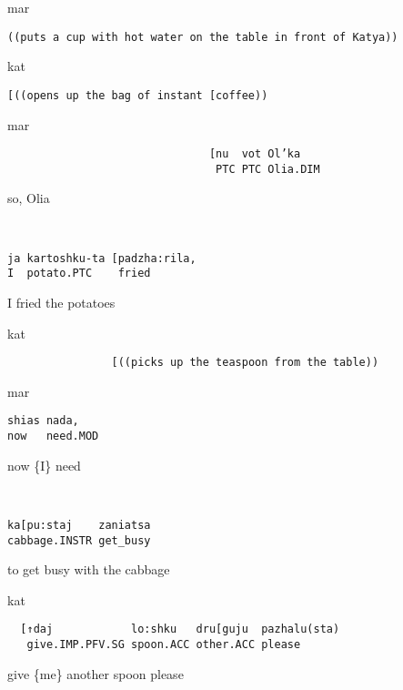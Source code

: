 \documentclass[output=paper,modfonts,nonflat]{langsci/langscibook}
\begin{document}
\vspace{2mm}
%
\begin{transbox}{1}{mar}
\begin{verbatim}
((puts a cup with hot water on the table in front of Katya))
\end{verbatim}
\end{transbox}
%
\begin{transbox}{2}{kat}%
\begin{verbatim}
[((opens up the bag of instant [coffee))
\end{verbatim}
\end{transbox}
%
\begin{transbox}{3}{mar}%
\begin{verbatim}
                               [nu  vot Ol’ka
                                PTC PTC Olia.DIM
\end{verbatim}
\hspace{4.7cm} so, Olia
\end{transbox}
%
\begin{transbox}{4}{~}
\begin{verbatim}
ja kartoshku-ta [padzha:rila,
I  potato.PTC    fried
\end{verbatim}
I fried the potatoes
\end{transbox}
%
\begin{transbox}{5}{kat}
\begin{verbatim}
                [((picks up the teaspoon from the table))
\end{verbatim}
\end{transbox}
%
\begin{transbox}{6}{mar}
\begin{verbatim}
shias nada,
now   need.MOD
\end{verbatim}
now \{I\} need
\end{transbox}
%
\begin{transbox}{7}{~}
\begin{verbatim}
ka[pu:staj    zaniatsa
cabbage.INSTR get_busy
\end{verbatim}
to get busy with the cabbage
\end{transbox}
%
\begin{mdframednoverticalspace}[style=firstfoc]
\begin{transbox}{8}{kat}
\begin{verbatim}
  [↑daj            lo:shku   dru[guju  pazhalu(sta)
   give.IMP.PFV.SG spoon.ACC other.ACC please
\end{verbatim}
\hspace{0.4cm} give \{me\} another spoon please
\end{transbox}
\end{mdframednoverticalspace}
\end{document}
